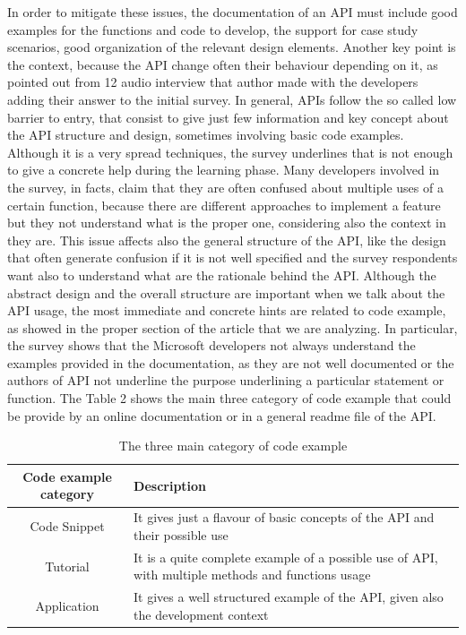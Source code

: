  In order to mitigate these issues, the documentation of an API must include good examples for the functions and code to develop, the support for case study scenarios, good organization of the relevant design elements. Another key point is the context, because the API change often their behaviour depending on it, as pointed out from 12 audio interview that author made with the developers adding their answer to the initial survey. In general, APIs follow the so called low barrier to entry, that consist to give just few information and key concept about the API structure and design, sometimes involving basic code examples. Although it is a very spread techniques, the survey underlines that is not enough to give a concrete help during the learning phase. Many developers involved in the survey, in facts, claim that they are often confused about multiple uses of a certain function, because there are different approaches to implement a feature but they not understand what is the proper one, considering also the context in they are. This issue affects also the general structure of the API, like the design that often generate confusion if it is not well specified and the survey respondents want also to understand what are the rationale behind the API.  \newline
Although the abstract design and the overall structure are important when we talk about the API usage, the most immediate and concrete hints are related to code example, as showed in the proper section of the article that we are analyzing. In particular, the survey shows that the Microsoft developers not always  understand the examples provided in the documentation, as they are not well documented or the authors of API not underline the purpose underlining a particular statement or function. The Table 2 shows the main three category of code example that could be provide by an online documentation or in a general readme file of the API. 
\begin{table}[!h]

  \caption{ The three main category of code example }
  \label{Table:2}
\begin{adjustbox}{width=1\textwidth}

\begin{tabular}{|c|p{8cm}|}

\hline
 \textbf{Code example category } & \textbf{Description} \\
\hline
 Code Snippet & It gives just a flavour of basic concepts of the API and their possible use\\
\hline
Tutorial & It is a quite complete example of a possible use of API, with multiple methods and functions usage\\
\hline
Application & It gives a well structured example of the API, given also the development context \\
\hline
\end{tabular}

\end{adjustbox}
\end{table} 

